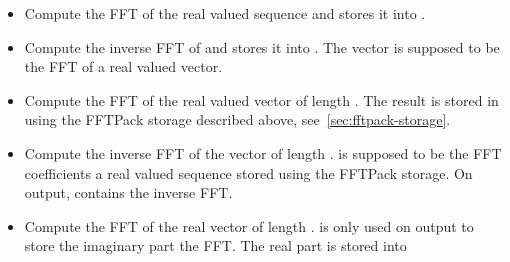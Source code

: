 \begin{itemize}
\item {}
  \sshortdescribe Compute the FFT of the real valued sequence  and
  stores it into .

\item {}
  \sshortdescribe Compute the inverse FFT of  and stores it into . The vector  is supposed to be the FFT of a real valued vector.

\item {}
  \sshortdescribe Compute the FFT of the real valued vector  of
  length . The result is stored in  using the FFTPack storage
  described above, see~\ref{sec:fftpack-storage}.

\item {}
  \sshortdescribe Compute the inverse FFT of the vector  of length
  .  is supposed to be the FFT coefficients a real valued
  sequence stored using the FFTPack storage. On output,  contains
  the inverse FFT.

\item {}
  \sshortdescribe Compute the FFT of the real vector  of length .
   is only used on output to store the imaginary part the FFT. The
  real part is stored into 


\end{itemize}
